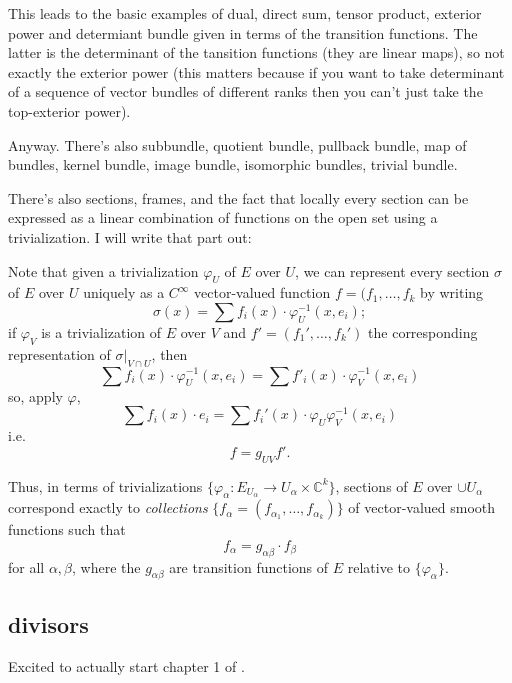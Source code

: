 \begin{enumerate}
This leads to the basic examples of dual, direct sum, tensor product, exterior power and determiant bundle given in terms of the transition functions. The latter is the determinant of the tansition functions (they are linear maps), so not exactly the exterior power (this matters because if you want to take determinant of a sequence of vector bundles of different ranks then you can't just take the top-exterior power). 

Anyway. There's also subbundle, quotient bundle, pullback bundle, map of bundles, kernel bundle, image bundle, isomorphic bundles, trivial bundle.

There's also sections, frames, and the fact that locally every section can be expressed as a linear combination of functions on the open set using a trivialization. I will write that part out:

Note that given a trivialization \(\varphi_{U}\) of \(E\) over \(U\), we can represent every section \(\sigma\) of \(E\) over \(U\) uniquely as a \(C^\infty\) vector-valued function \(f=(f_1,\ldots,f_k\) by writing
\[\sigma(x)= \sum f_i(x) \cdot \varphi_U^{-1}(x,e_i);\]
if  \(\varphi_V\) is a trivialization of \(E\) over \(V\) and \(f'=(f_1',\ldots,f_k')\) the corresponding representation of  \(\sigma|_{V \cap U}\), then
\[\sum f_i(x) \cdot \varphi_U^{-1}(x,e_i)=\sum f'_i(x)\cdot \varphi_V^{-1}(x,e_i)\]
so, apply \(\varphi\),
\[\sum f_i(x)\cdot e_i=\sum f_i'(x) \cdot \varphi_U \varphi_V^{-1}(x,e_i)\]
i.e.
\[f=g_{UV}f'.\]
\begin{tcolorbox}[colback=white,colframe=black,boxrule=0.5pt,sharp corners]
Thus, in terms of trivializations $\{\varphi_\alpha:E_{U_\alpha}\to U_\alpha\times \mathbb{C}^k\}$, sections of $E$ over $\cup U_\alpha$ correspond exactly to \textit{collections} $\{f_\alpha=(f_{\alpha_1},\ldots,f_{\alpha_k})\}$ of vector-valued smooth functions such that
\[
f_\alpha=g_{\alpha\beta}\cdot f_\beta
\]
for all $\alpha,\beta$, where the $g_{\alpha\beta}$ are transition functions of $E$ relative to $\{\varphi_\alpha\}$.
\end{tcolorbox}
\end{enumerate}

\subsection{divisors}

Excited to actually start chapter 1 of \cite{gri}.

